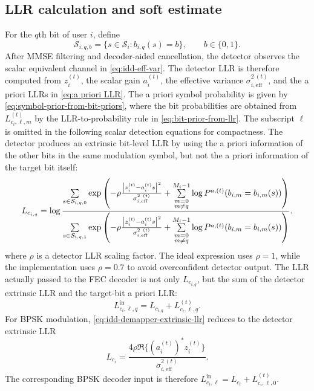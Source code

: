 \subsection{LLR calculation and soft estimate}
 \label{sec:LLR calculation and soft estimate}
For the $q$th bit of user $i$, define
\begin{equation}
    \mathcal{S}_{i,q,b}
    =
    \{s\in\mathcal{S}_i:b_{i,q}(s)=b\},
    \qquad b\in\{0,1\}.
\end{equation}
After MMSE filtering and decoder-aided cancellation, the detector observes the scalar equivalent channel in \eqref{eq:idd-eff-var}. The detector LLR is therefore computed from $z_i^{(t)}$, the scalar gain $a_i^{(t)}$, the effective variance $\sigma_{i,\mathrm{eff}}^{2~(t)}$, and the a priori LLRs in \eqref{eq:a priori LLR}. The a priori symbol probability is given by \eqref{eq:symbol-prior-from-bit-priors}, where the bit probabilities are obtained from $L^{(t)}_{c_i,\ell,m}$ by the LLR-to-probability rule in \eqref{eq:bit-prior-from-llr}. The subscript $\ell$ is omitted in the following scalar detection equations for compactness.
The detector produces an extrinsic bit-level LLR by using the a priori information of the other bits in the same modulation symbol, but not the a priori information of the target bit itself:
\begin{equation}
    L_{c_{i,q}}
    =
    \log
    \frac{
    \sum\limits_{s\in\mathcal{S}_{i,q,0}}
    \exp\left(
    -\rho\frac{\left\lvert z^{(t)}_{i}-a^{(t)}_{i} s \right\rvert^2}
    {\sigma_{i,\mathrm{eff}}^{2~(t)}}
    +
    \sum\limits_{\substack{m=0\\m\ne q}}^{M_i-1}
    \log P^{a,(t)}(b_{i,m}=b_{i,m}(s))
    \right)}
    {\sum\limits_{s\in\mathcal{S}_{i,q,1}}
    \exp\left(
    -\rho\frac{\left\lvert z^{(t)}_{i}-a^{(t)}_{i} s \right\rvert^2}
    {\sigma_{i,\mathrm{eff}}^{2~(t)}}
    +
    \sum\limits_{\substack{m=0\\m\ne q}}^{M_i-1}
    \log P^{a,(t)}(b_{i,m}=b_{i,m}(s))
    \right)} .
    \label{eq:idd-demapper-extrinsic-llr}
\end{equation}
where $\rho$ is a detector LLR scaling factor. The ideal expression uses $\rho=1$, while the implementation uses $\rho=0.7$ to avoid overconfident detector output. The LLR actually passed to the FEC decoder is not only $L_{c_{i,q}}$, but the sum of the detector extrinsic LLR and the target-bit a priori LLR:
\begin{equation}
    L^{\mathrm{in}}_{c_i,\ell,q}
    =
    L_{c_{i,q}}
    +
    L^{(t)}_{c_i,\ell,q}.
    \label{eq:decoder-input-llr}
\end{equation}
For BPSK modulation, \eqref{eq:idd-demapper-extrinsic-llr} reduces to the detector extrinsic LLR
\begin{equation}
    L_{c_i}
    =
    \frac{4\rho\Re\{(a_i^{(t)})^*z_i^{(t)}\}}
    {\sigma_{i,\mathrm{eff}}^{2~(t)}}.
    \label{eq:idd-bpsk-llr}
\end{equation}
The corresponding BPSK decoder input is therefore $L^{\mathrm{in}}_{c_i,\ell}=L_{c_i}+L^{(t)}_{c_i,\ell,0}$.


